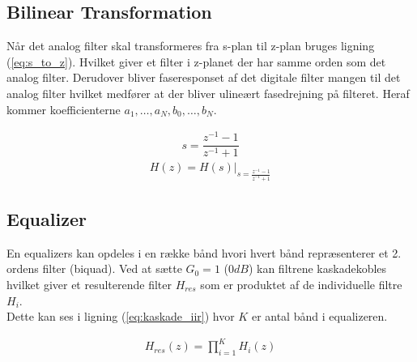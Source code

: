     \subsection{Bilinear Transformation}
    Når det analog filter skal transformeres fra s-plan til z-plan bruges ligning (\ref{eq:s_to_z}). Hvilket giver et 
    filter i z-planet der har samme orden som det analog filter. Derudover bliver faseresponset af det digitale filter mangen til 
    det analog filter hvilket medfører at der bliver ulineært fasedrejning på filteret. 
    Heraf kommer koefficienterne $a_1, \dots, a_N, b_0,\dots, b_N $. 
  
    \begin{align}
    s = \dfrac{z^{-1} - 1}{z^{-1} + 1}  
    \label{eq:s_to_z}
    \end{align}
    \begin{align}
    H(z) = H(s)\big|_{s = \frac{z^{-1} - 1}{z^{-1}+ 1 }}
    \end{align}

    
   \subsection{Equalizer}

   En equalizers kan opdeles i en række bånd hvori hvert bånd repræsenterer et 
   2. ordens filter (biquad). Ved at sætte $G_0 = 1$ ($0 dB$) kan filtrene kaskadekobles hvilket giver 
   et resulterende filter $H_{res}$ som er produktet af de individuelle filtre $H_i$. \\
   Dette kan ses i ligning (\ref{eq:kaskade_iir}) hvor $K$ er antal bånd i equalizeren.  

   \begin{align}
    H_{res}(z) = \prod_{i=1}^{K} H_i(z)
    \label{eq:kaskade_iir}
   \end{align} 




 






